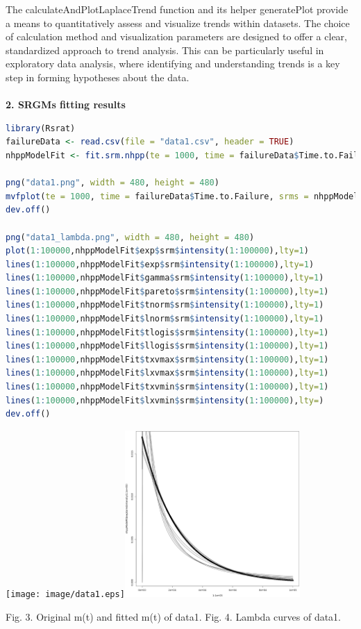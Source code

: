 \documentclass[12pt]{article}
\numberwithin{table}{section}
\begin{document}
The calculateAndPlotLaplaceTrend function and its helper generatePlot provide a means to quantitatively assess and visualize trends within datasets. The choice of calculation method and visualization parameters are designed to offer a clear, standardized approach to trend analysis. This can be particularly useful in exploratory data analysis, where identifying and understanding trends is a key step in forming hypotheses about the data.\\
\\

	\textbf{2. SRGMs fitting results}
	
	\begin{lstlisting}[language=R]
library(Rsrat)
failureData <- read.csv(file = "data1.csv", header = TRUE)
nhppModelFit <- fit.srm.nhpp(te = 1000, time = failureData$Time.to.Failure, selection = NULL)

png("data1.png", width = 480, height = 480)
mvfplot(te = 1000, time = failureData$Time.to.Failure, srms = nhppModelFit)
dev.off()

png("data1_lambda.png", width = 480, height = 480)
plot(1:100000,nhppModelFit$exp$srm$intensity(1:100000),lty=1)
lines(1:100000,nhppModelFit$exp$srm$intensity(1:100000),lty=1)
lines(1:100000,nhppModelFit$gamma$srm$intensity(1:100000),lty=1)
lines(1:100000,nhppModelFit$pareto$srm$intensity(1:100000),lty=1)
lines(1:100000,nhppModelFit$tnorm$srm$intensity(1:100000),lty=1)
lines(1:100000,nhppModelFit$lnorm$srm$intensity(1:100000),lty=1)
lines(1:100000,nhppModelFit$tlogis$srm$intensity(1:100000),lty=1)
lines(1:100000,nhppModelFit$llogis$srm$intensity(1:100000),lty=1)
lines(1:100000,nhppModelFit$txvmax$srm$intensity(1:100000),lty=1)
lines(1:100000,nhppModelFit$lxvmax$srm$intensity(1:100000),lty=1)
lines(1:100000,nhppModelFit$txvmin$srm$intensity(1:100000),lty=1)
lines(1:100000,nhppModelFit$lxvmin$srm$intensity(1:100000),lty=)
dev.off()\end{lstlisting} 

\begin{center}
	\texttt{[image: image/data1.eps]}\includegraphics[width=0.5\textwidth]{image/data1_lambda.eps}
	
	{\small Fig. 3. Original m(t) and fitted m(t) of data1.}
	{\small Fig. 4. Lambda curves of data1.}
\end{center}
\end{document}
